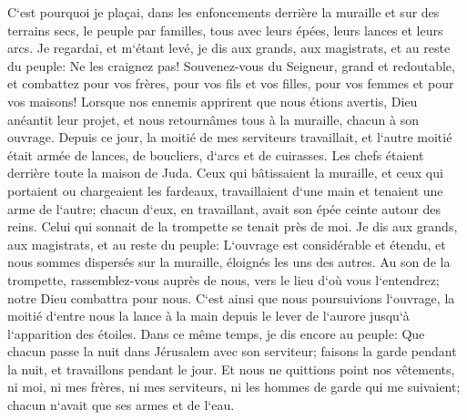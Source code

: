 \verse C`est pourquoi je plaçai, dans les enfoncements derrière la muraille et sur des terrains secs, le peuple par familles, tous avec leurs épées, leurs lances et leurs arcs. 
\verse Je regardai, et m`étant levé, je dis aux grands, aux magistrats, et au reste du peuple: Ne les craignez pas! Souvenez-vous du Seigneur, grand et redoutable, et combattez pour vos frères, pour vos fils et vos filles, pour vos femmes et pour vos maisons! 
\verse Lorsque nos ennemis apprirent que nous étions avertis, Dieu anéantit leur projet, et nous retournâmes tous à la muraille, chacun à son ouvrage. 
\verse Depuis ce jour, la moitié de mes serviteurs travaillait, et l`autre moitié était armée de lances, de boucliers, d`arcs et de cuirasses. Les chefs étaient derrière toute la maison de Juda. 
\verse Ceux qui bâtissaient la muraille, et ceux qui portaient ou chargeaient les fardeaux, travaillaient d`une main et tenaient une arme de l`autre; 
\verse chacun d`eux, en travaillant, avait son épée ceinte autour des reins. Celui qui sonnait de la trompette se tenait près de moi. 
\verse Je dis aux grands, aux magistrats, et au reste du peuple: L`ouvrage est considérable et étendu, et nous sommes dispersés sur la muraille, éloignés les uns des autres. 
\verse Au son de la trompette, rassemblez-vous auprès de nous, vers le lieu d`où vous l`entendrez; notre Dieu combattra pour nous. 
\verse C`est ainsi que nous poursuivions l`ouvrage, la moitié d`entre nous la lance à la main depuis le lever de l`aurore jusqu`à l`apparition des étoiles. 
\verse Dans ce même temps, je dis encore au peuple: Que chacun passe la nuit dans Jérusalem avec son serviteur; faisons la garde pendant la nuit, et travaillons pendant le jour. 
\verse Et nous ne quittions point nos vêtements, ni moi, ni mes frères, ni mes serviteurs, ni les hommes de garde qui me suivaient; chacun n`avait que ses armes et de l`eau. 

